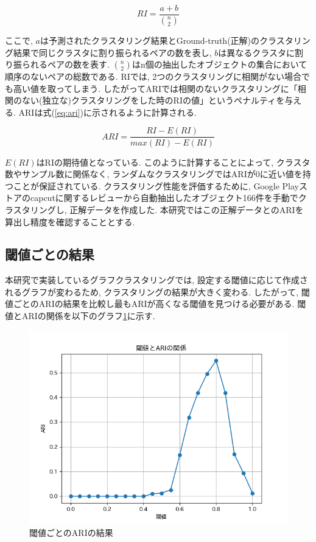 \begin{equation}
  \label{eq:ri}
  RI = \frac{a+b}{\binom{n}{2}}
\end{equation}

ここで, \(a\)は予測されたクラスタリング結果とGround-truth(正解)のクラスタリング結果で同じクラスタに割り振られるペアの数を表し, \(b\)は異なるクラスタに割り振られるペアの数を表す. \(\binom{n}{2}\)はn個の抽出したオブジェクトの集合において順序のないペアの総数である. 
RIでは, 2つのクラスタリングに相関がない場合でも高い値を取ってしまう. したがってARIでは相関のないクラスタリングに「相関のない(独立な)クラスタリングをした時のRIの値」というペナルティを与える. ARIは式(\ref{eq:ari})に示されるように計算される. 

\begin{equation}
  \label{eq:ari}
  ARI = \frac{RI-E(RI)}{max(RI)-E(RI)}
\end{equation}

\(E(RI)\)はRIの期待値となっている. このように計算することによって, クラスタ数やサンプル数に関係なく, ランダムなクラスタリングではARIが0に近い値を持つことが保証されている. 
クラスタリング性能を評価するために, Google Playストアのcapcutに関するレビューから自動抽出したオブジェクト166件を手動でクラスタリングし, 正解データを作成した. 本研究ではこの正解データとのARIを算出し精度を確認することとする. 

\subsection{閾値ごとの結果}
本研究で実装しているグラフクラスタリングでは, 設定する閾値に応じて作成されるグラフが変わるため, クラスタリングの結果が大きく変わる. したがって, 閾値ごとのARIの結果を比較し最もARIが高くなる閾値を見つける必要がある. 
閾値とARIの関係を以下のグラフ\ref{fig:cw_graph}に示す.

\begin{figure}[hbtp]
  \centering
  \includegraphics[scale=0.8]
    {contents/images/cw_graph.png}
  \caption{閾値ごとのARIの結果\label{fig:cw_graph}}
\end{figure}

